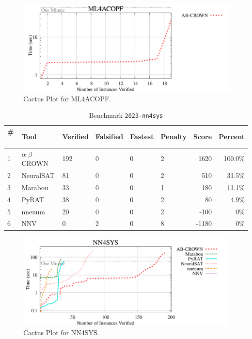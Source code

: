 \begin{figure}[h]
\centerline{\includegraphics[width=\textwidth]{cactus/2023_ml4acopf.pdf}}
\caption{Cactus Plot for ML4ACOPF.}
\label{fig:quantPic}
\end{figure}



\begin{table}[h]
\begin{center}
\caption{Benchmark \texttt{2023-nn4sys}} \label{tab:cat_{cat}}
{\setlength{\tabcolsep}{2pt}
\begin{tabular}[h]{@{}llllllrr@{}}
\toprule
\textbf{\# ~} & \textbf{Tool} & \textbf{Verified} & \textbf{Falsified} & \textbf{Fastest} & \textbf{Penalty} & \textbf{Score} & \textbf{Percent}\\
\midrule
1 & $\alpha$-$\beta$-CROWN & 192 & 0 & 0 & 2 & 1620 & 100.0\% \\
2 & NeuralSAT & 81 & 0 & 0 & 2 & 510 & 31.5\% \\
3 & Marabou & 33 & 0 & 0 & 1 & 180 & 11.1\% \\
4 & PyRAT & 38 & 0 & 0 & 2 & 80 & 4.9\% \\
5 & nnenum & 20 & 0 & 0 & 2 & -100 & 0\% \\
6 & NNV & 0 & 2 & 0 & 8 & -1180 & 0\% \\
\bottomrule
\end{tabular}
}
\end{center}
\end{table}



\begin{figure}[h]
\centerline{\includegraphics[width=\textwidth]{cactus/2023_nn4sys.pdf}}
\caption{Cactus Plot for NN4SYS.}
\label{fig:quantPic}
\end{figure}


